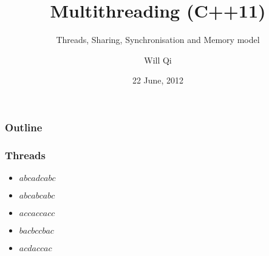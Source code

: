 \documentclass{beamer}
\title{Multithreading (C++11)}
\subtitle{Threads, Sharing, Synchronisation and Memory model}
\author{Will Qi}
\date{22 June, 2012}
\begin{document}
\maketitle

\begin{frame}
  \frametitle{Outline}
    \tableofcontents[part=1,pausesections]
\end{frame}

\begin{frame}
  \frametitle{Threads}
  \begin{itemize}[<+->]
 \item<1> $abcadcabc$
  \item<1-2> \alert<2>{$abcabcabc$}
  \item<1-2> $accaccacc$
  \item<1> $bacbccbac$
  \item<1,3> $acdaccac$
  \end{itemize}
\end{frame}
\end{document}
